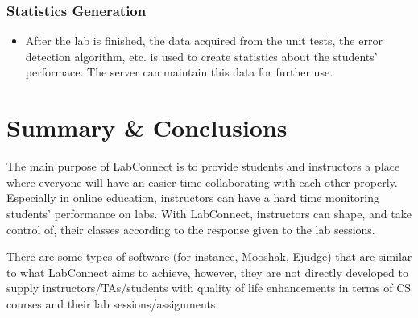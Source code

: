 \documentclass[a4paper, 12pt]{article}
\begin{document}
    \subsubsection{Statistics Generation}

    \begin{itemize}
      \item After the lab is finished, the data acquired from the unit tests, the error detection algorithm, etc. is used
      to create statistics about the students' performace. The server can maintain this data for further use.
    \end{itemize}

    \section{Summary \& Conclusions}

    The main purpose of LabConnect is to provide students and instructors a place where everyone will have an easier time
    collaborating with each other properly. Especially in online education, instructors can have a hard time monitoring students'
    performance on labs. With LabConnect, instructors can shape, and take control of, their classes according to the response given to the lab sessions.
    
    There are some types of software (for instance, Mooshak, Ejudge) that are similar to what LabConnect aims to achieve, however, they are not directly 
    developed to supply instructors/TAs/students with quality of life enhancements in terms of CS courses and their lab sessions/assignments. 


    \pagebreak

    \printbibliography
\end{document}
